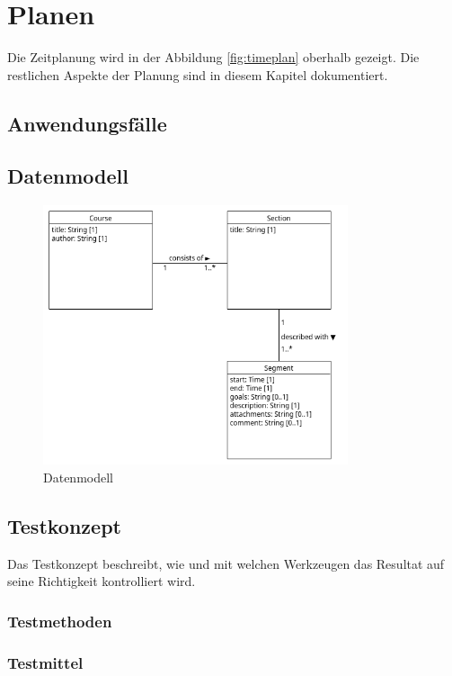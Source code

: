 \chapter{Planen}
Die Zeitplanung wird in der Abbildung \ref{fig:timeplan} oberhalb gezeigt. Die restlichen Aspekte der Planung sind in diesem Kapitel dokumentiert.

\section{Anwendungsfälle}

\section{Datenmodell}
\begin{figure}[H]
  \begin{center}
    \includegraphics[width=0.8\textwidth]{../res/datamodel.png}
  \end{center}
  \caption[\enquote{Datenmodell} visualisiert mit Umlet]{Datenmodell}
  \label{fig:datamodel}
\end{figure}

\section{Testkonzept}
Das Testkonzept beschreibt, wie und mit welchen Werkzeugen das Resultat auf seine Richtigkeit kontrolliert wird.

\subsection{Testmethoden}

\subsection{Testmittel}